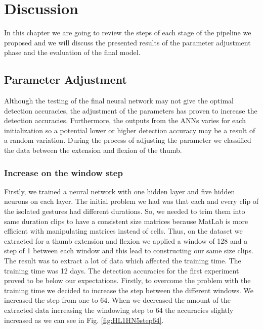 \chapter{Discussion}
In this chapter we are going to review the steps of each stage of the pipeline we proposed and we will discuss the presented results of the parameter adjustment phase and the evaluation of the final model.
\section{Parameter Adjustment}
Although the testing of the final neural network may not give the optimal detection accuracies, the adjustment of the parameters has proven to increase the detection accuracies. Furthermore, the outputs from the ANNs varies for each initialization so a potential lower or higher detection accuracy may be a result of a random variation. During the process of adjusting the parameter we classified the data between the extension and flexion of the thumb.\\
\subsection{Increase on the window step}
Firstly, we trained a neural network with one hidden layer and five hidden neurons on each layer. The initial problem we had was that each and every clip of the isolated gestures had different durations. So, we needed to trim them into same duration clips to have a consistent size matrices because MatLab is more efficient with manipulating matrices instead of cells. Thus, on the dataset we extracted for a thumb extension and flexion we applied a window of 128 and a step of 1 between each window and this lead to constructing our same size clips. The result was to extract a lot of data which affected the training time. The training time was 12 days. The detection accuracies for the first experiment proved to be below our expectations. Firstly, to overcome the problem with the training time we decided to increase the step between the different windows. We increased the step from one to 64. When we decreased the amount of the extracted data increasing the windowing step to 64 the accuracies slightly increased as we can see in Fig. \ref{fig:HL1HN5step64}.\\
